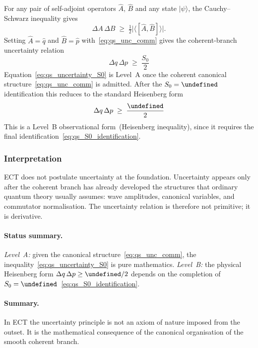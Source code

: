 \documentclass[11pt,a4paper]{article}
\let\hbar\undefined
\numberwithin{equation}{section}
\begin{document}
For any pair of self-adjoint operators $\hat A$, $\hat B$ and any
state $|\psi\rangle$, the Cauchy--Schwarz inequality gives
\begin{equation}
  \label{eq:qs_robertson}
  \Delta A\,\Delta B
  \;\ge\;
  \tfrac{1}{2}\bigl|\langle[\hat A,\hat B]\rangle\bigr|.
\end{equation}
Setting $\hat A=\hat q$ and $\hat B=\hat p$ with~\eqref{eq:qs_unc_comm}
gives the coherent-branch uncertainty relation
\begin{equation}
  \label{eq:qs_uncertainty_S0}
  \Delta q\,\Delta p
  \;\ge\;
  \frac{S_0}{2}
\end{equation}
Equation~\eqref{eq:qs_uncertainty_S0} is Level~A once the coherent
canonical structure~\eqref{eq:qs_unc_comm} is admitted.
After the $S_0=\hbar$ identification this reduces to the standard
Heisenberg form
\begin{equation}
  \label{eq:qs_uncertainty_hbar}
  \Delta q\,\Delta p
  \;\ge\;
  \frac{\hbar}{2}
\end{equation}
This is a Level~B observational form~(Heisenberg inequality),
since it requires the final identification~\eqref{eq:qs_S0_identification}.

\subsubsection*{Interpretation}

ECT does not postulate uncertainty at the foundation.
Uncertainty appears only after the coherent branch has already
developed the structures that ordinary quantum theory usually assumes:
wave amplitudes, canonical variables, and commutator normalisation.
The uncertainty relation is therefore not primitive; it is derivative.

\paragraph{Status summary.}
\textit{Level~A:} given the canonical structure~\eqref{eq:qs_unc_comm},
the inequality~\eqref{eq:qs_uncertainty_S0} is pure mathematics.
\textit{Level~B:} the physical Heisenberg form
$\Delta q\,\Delta p\ge\hbar/2$ depends on the completion of
$S_0=\hbar$~\eqref{eq:qs_S0_identification}.

\paragraph{Summary.}
In ECT the uncertainty principle is not an axiom of nature imposed from
the outset.
It is the mathematical consequence of the canonical organisation of the
smooth coherent branch.
\end{document}
